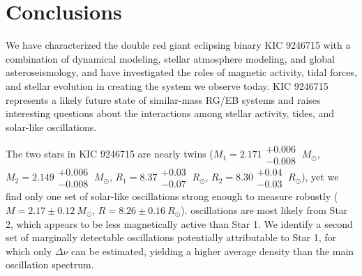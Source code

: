 \section{Conclusions}\label{conclude}

We have characterized the double red giant eclipsing binary KIC 9246715 with a combination of dynamical modeling, stellar atmosphere modeling, and global asteroseismology, and have investigated the roles of magnetic activity, tidal forces, and stellar evolution in creating the system we observe today. KIC 9246715 represents a likely future state of similar-mass RG/EB systems and raises interesting questions about the interactions among stellar activity, tides, and solar-like oscillations.

The two stars in KIC 9246715 are nearly twins ($M_1 = 2.171\substack{+0.006 \\ -0.008} \ M_{\odot}$, $M_2 = 2.149\substack{+0.006 \\ -0.008} \ M_{\odot}$, $R_1 = 8.37\substack{+0.03 \\ -0.07} \ R_{\odot}$, $R_2 = 8.30\substack{+0.04 \\ -0.03} \ R_{\odot}$), yet we find only one set of solar-like oscillations strong enough to measure robustly ($M = 2.17 \pm 0.12 \ M_{\odot}$, $R = 8.26 \pm 0.16 \ R_{\odot}$).  oscillations are most likely from Star 2, which appears to be less magnetically active than Star 1. We identify a second set of marginally detectable oscillations potentially attributable to Star 1, for which only $\Delta \nu$ can be estimated, yielding a higher average density than the main oscillation spectrum. 

